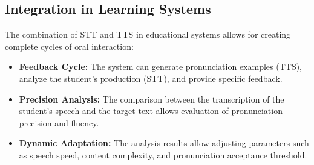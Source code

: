 \subsection{Integration in Learning Systems}

The combination of STT and TTS in educational systems allows for creating complete cycles of oral interaction:

\begin{itemize}
  \item \textbf{Feedback Cycle:} The system can generate pronunciation examples (TTS), analyze the student's production (STT), and provide specific feedback.

  \item \textbf{Precision Analysis:} The comparison between the transcription of the student's speech and the target text allows evaluation of pronunciation precision and fluency.

  \item \textbf{Dynamic Adaptation:} The analysis results allow adjusting parameters such as speech speed, content complexity, and pronunciation acceptance threshold.
\end{itemize}